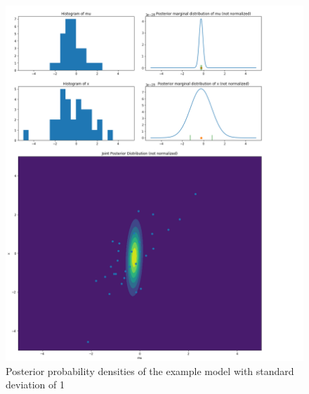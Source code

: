 \documentclass{article}
\begin{document}
\begin{figure}
	\includegraphics[width=\textwidth]{images/ground_truth_posterior_3_cut.png}
	\caption[Posterior probability densities of the example model with standard deviation of 1]{Posterior probability densities of the example model with standard deviation of 1}
	\label{fig:ground_truth_posterior_3}
\end{figure}
\end{document}
